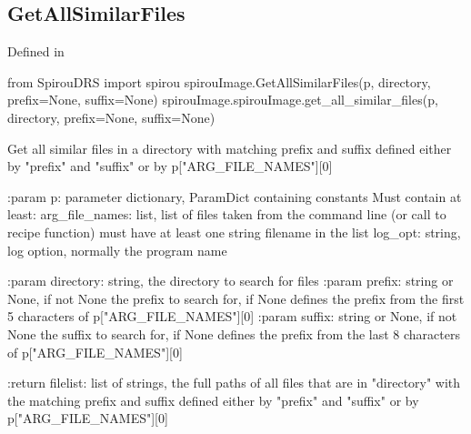 \begin{minipage}{\textwidth}
\subsection{GetAllSimilarFiles}

Defined in \spirouImage{}

\begin{pythonbox}
from SpirouDRS import spirou
spirouImage.GetAllSimilarFiles(p, directory, prefix=None, suffix=None)
spirouImage.spirouImage.get_all_similar_files(p, directory, prefix=None, suffix=None)
\end{pythonbox}

\begin{pythondocstring}
Get all similar files in a directory with matching prefix and suffix defined
either by "prefix" and "suffix" or by p["ARG_FILE_NAMES"][0]

:param p: parameter dictionary, ParamDict containing constants
    Must contain at least:
            arg_file_names: list, list of files taken from the command line
                            (or call to recipe function) must have at least
                            one string filename in the list
            log_opt: string, log option, normally the program name

:param directory: string, the directory to search for files
:param prefix: string or None, if not None the prefix to search for, if
               None defines the prefix from the first 5 characters of
               p["ARG_FILE_NAMES"][0]
:param suffix: string  or None, if not None the suffix to search for, if
               None defines the prefix from the last 8 characters of
               p["ARG_FILE_NAMES"][0]

:return filelist: list of strings, the full paths of all files that are in
                  "directory" with the matching prefix and suffix defined
                  either by "prefix" and "suffix" or by
                  p["ARG_FILE_NAMES"][0]
\end{pythondocstring}
\end{minipage}


